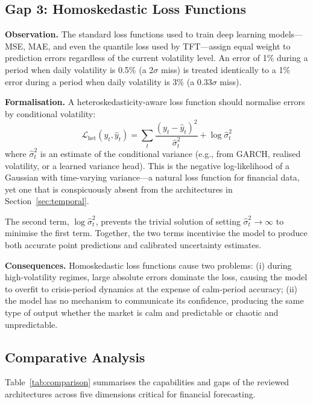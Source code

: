 \documentclass[conference]{IEEEtran}
\begin{document}
\subsection{Gap 3: Homoskedastic Loss Functions}

\textbf{Observation.} The standard loss functions used to train deep learning models---MSE, MAE, and even the quantile loss used by TFT---assign equal weight to prediction errors regardless of the current volatility level. An error of 1\% during a period when daily volatility is 0.5\% (a 2$\sigma$ miss) is treated identically to a 1\% error during a period when daily volatility is 3\% (a 0.33$\sigma$ miss).

\textbf{Formalisation.} A heteroskedasticity-aware loss function should normalise errors by conditional volatility:
\begin{equation}
\mathcal{L}_{\text{het}}(y_t, \hat{y}_t) = \sum_t \frac{(y_t - \hat{y}_t)^2}{\hat{\sigma}_t^2} + \log \hat{\sigma}_t^2
\label{eq:het_loss}
\end{equation}
where $\hat{\sigma}_t^2$ is an estimate of the conditional variance (e.g., from GARCH, realised volatility, or a learned variance head). This is the negative log-likelihood of a Gaussian with time-varying variance---a natural loss function for financial data, yet one that is conspicuously absent from the architectures in Section~\ref{sec:temporal}.

The second term, $\log \hat{\sigma}_t^2$, prevents the trivial solution of setting $\hat{\sigma}_t^2 \to \infty$ to minimise the first term. Together, the two terms incentivise the model to produce both accurate point predictions and calibrated uncertainty estimates.

\textbf{Consequences.} Homoskedastic loss functions cause two problems: (i) during high-volatility regimes, large absolute errors dominate the loss, causing the model to overfit to crisis-period dynamics at the expense of calm-period accuracy; (ii) the model has no mechanism to communicate its confidence, producing the same type of output whether the market is calm and predictable or chaotic and unpredictable.

\subsection{Comparative Analysis}

Table~\ref{tab:comparison} summarises the capabilities and gaps of the reviewed architectures across five dimensions critical for financial forecasting.
\end{document}
